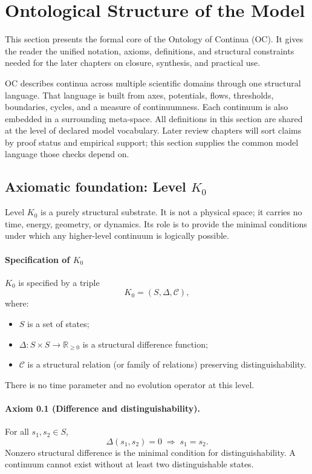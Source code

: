 
\section{Ontological Structure of the Model}
\label{sec:model}

This section presents the formal core of the Ontology of Continua (OC).
It gives the reader the unified notation, axioms, definitions, and structural
constraints needed for the later chapters on closure, synthesis, and practical
use.

OC describes continua across multiple scientific domains through one structural
language. That language is built from axes, potentials, flows, thresholds,
boundaries, cycles, and a measure of continuumness. Each continuum is also
embedded in a surrounding meta-space. All definitions in this section are
shared at the level of declared model vocabulary. Later review chapters
will sort claims by proof status and empirical support; this section supplies
the common model language those checks depend on.

\subsection{Axiomatic foundation: Level \texorpdfstring{$K_0$}{K\_0}}

Level \(K_0\) is a purely structural substrate.
It is not a physical space; it carries no time, energy, geometry, or dynamics.
Its role is to provide the minimal conditions under which any higher-level continuum is logically possible.

\paragraph{Specification of \texorpdfstring{\(K_0\)}{K\_0}}
\(K_0\) is specified by a triple
\[
    K_0 = (S,\Delta,\mathcal{C}),
\]
where:
\begin{itemize}
    \item \(S\) is a set of states;
    \item \(\Delta : S \times S \to \mathbb{R}_{\ge 0}\) is a structural difference function;
    \item \(\mathcal{C}\) is a structural relation (or family of relations) preserving distinguishability.
\end{itemize}
There is no time parameter and no evolution operator at this level.

\paragraph{Axiom 0.1 (Difference and distinguishability).}
For all \(s_1,s_2 \in S\),
\[
    \Delta(s_1,s_2) = 0 \;\Rightarrow\; s_1 = s_2.
\]
Nonzero structural difference is the minimal condition for distinguishability.
A continuum cannot exist without at least two distinguishable states.

